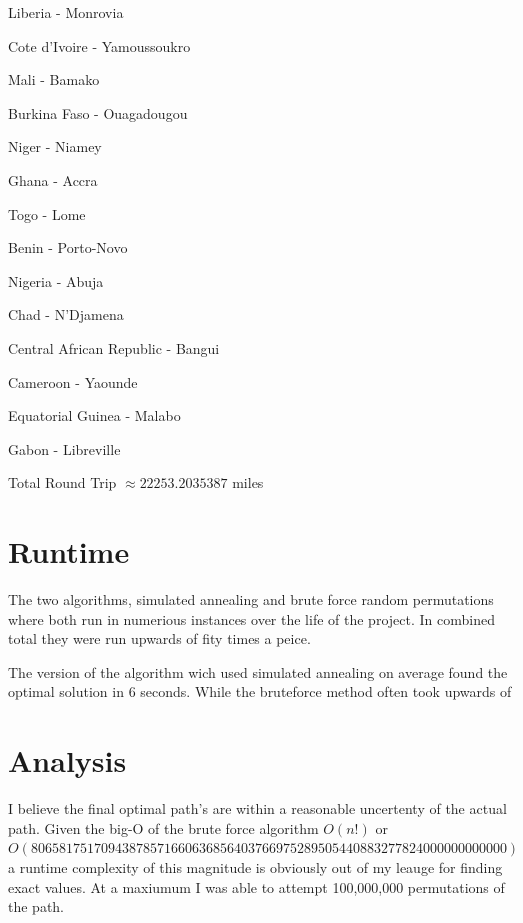 \documentclass[12pt]{article}
\begin{document}
\begin{multicols}{3}
\begin{enumerate*}
\item Liberia - Monrovia
\item Cote d'Ivoire - Yamoussoukro
\item Mali - Bamako
\item Burkina Faso - Ouagadougou
\item Niger - Niamey
\item Ghana - Accra
\item Togo - Lome
\item Benin - Porto-Novo
\item Nigeria - Abuja
\item Chad - N'Djamena
\item Central African Republic - Bangui
\item Cameroon - Yaounde
\item Equatorial Guinea - Malabo
\item Gabon - Libreville
\end{enumerate*}
\end{multicols}

Total Round Trip $\approx 22253.2035387$ miles

\section{Runtime}

The two algorithms, simulated annealing and brute force random permutations where both run in numerious instances over the life of the project. 
In combined total they were run upwards of fity times a peice.

The version of the algorithm wich used simulated annealing on average found the optimal solution in 6 seconds. 
While the bruteforce method often took upwards of 

\section{Analysis}

I believe the final optimal path's are within a reasonable uncertenty of the actual path.
Given the big-O of the brute force algorithm $O(n!)$ or $O(80658175170943878571660636856403766975289505440883277824000000000000)$ a runtime complexity of this magnitude is obviously out of my leauge for finding exact values.
At a maxiumum I was able to attempt 100,000,000 permutations of the path.
\end{document}
